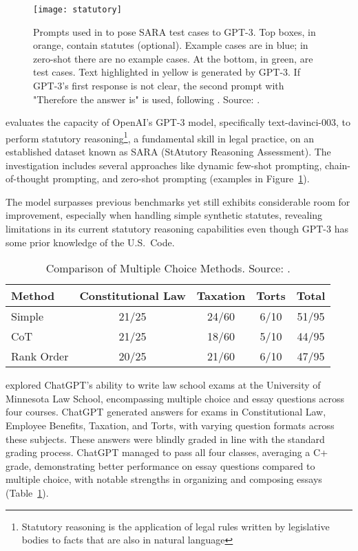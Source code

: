 \begin{figure}[!h]
	\centering
	\texttt{[image: statutory]}
	\caption{Prompts used in \protect\textcite{blairstanek2023gpt3statutory} to pose SARA test cases to GPT-3. Top boxes, in orange, contain statutes (optional). Example cases are in blue; in zero-shot there are no example cases. At the bottom, in green, are test cases. Text highlighted in yellow is generated by GPT-3. If GPT-3’s first response is not clear, the second prompt with "Therefore the answer is" is used, following \protect\textcite{kojima2022largelanguagemodels}. Source: \protect\textcite{trautmann2022legalprompt}.}
	\label{fig:legal_prompting}
\end{figure}


\textcite{blairstanek2023gpt3statutory} evaluates the capacity of OpenAI's GPT-3 model, specifically text-davinci-003, to perform statutory reasoning\footnote{Statutory reasoning is the application of legal rules written by legislative bodies to facts that are also in natural language}, a fundamental skill in legal practice, on an established dataset known as SARA (StAtutory Reasoning Assessment).
The investigation includes several approaches like dynamic few-shot prompting, chain-of-thought prompting, and zero-shot prompting (examples in Figure~\ref{fig:legal_prompting}).

The model surpasses previous benchmarks yet still exhibits considerable room for improvement, especially when handling simple synthetic statutes, revealing limitations in its current statutory reasoning capabilities even though GPT-3 has some prior knowledge of the U.S.\ Code.

\begin{table}[!h]
	\centering
	\begin{tabularx}{\textwidth}{Xcccc}
		\toprule
		Method     & Constitutional Law & Taxation & Torts & Total \\
		\midrule
		Simple     & 21/25              & 24/60    & 6/10  & 51/95 \\
		CoT        & 21/25              & 18/60    & 5/10  & 44/95 \\
		Rank Order & 20/25              & 21/60    & 6/10  & 47/95 \\
		\bottomrule
	\end{tabularx}
	\caption{Comparison of Multiple Choice Methods. Source: \protect\textcite{choi2023chatgptlaw}.}
	\label{tab:mc_comparison}
\end{table}

\textcite{choi2023chatgptlaw} explored ChatGPT's ability to write law school exams at the University of Minnesota Law School, encompassing multiple choice and essay questions across four courses.
ChatGPT generated answers for exams in Constitutional Law, Employee Benefits, Taxation, and Torts, with varying question formats across these subjects.
These answers were blindly graded in line with the standard grading process.
ChatGPT managed to pass all four classes, averaging a C+ grade, demonstrating better performance on essay questions compared to multiple choice, with notable strengths in organizing and composing essays (Table~\ref{tab:mc_comparison}).

